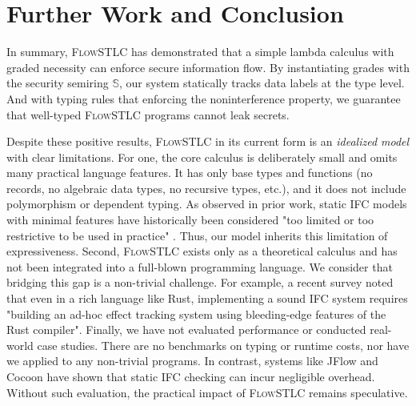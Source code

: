 \documentclass[conference]{IEEEtran}
\newcommand\secure{\mathbb{S}}
\begin{document}
\section{Further Work and Conclusion}

In summary, \textsc{FlowSTLC} has demonstrated that a simple lambda calculus with graded necessity can enforce secure information flow. By instantiating grades with the  security semiring $\secure$, our system statically tracks data labels at the type level. And with typing rules that enforcing the noninterference property, we guarantee that well-typed \textsc{FlowSTLC} programs cannot leak secrets. 

Despite these positive results, \textsc{FlowSTLC} in its current form is an \emph{idealized model} with clear limitations. For one, the core calculus is deliberately small and omits many practical language features. It has only base types and functions (no records, no algebraic data types, no recursive types, etc.), and it does not include polymorphism or dependent typing. As observed in prior work, static IFC models with minimal features have historically been considered "too limited or too restrictive to be used in practice" \cite{myers1999jflow}. Thus, our model inherits this limitation of expressiveness. Second, \textsc{FlowSTLC} exists only as a theoretical calculus and has not been integrated into a full-blown programming language. We consider that bridging this gap is a non-trivial challenge. For example, a recent survey noted that even in a rich language like Rust, implementing a sound IFC system requires "building an ad-hoc effect tracking system using bleeding-edge features of the Rust compiler". Finally, we have not evaluated performance or conducted real-world case studies. There are no benchmarks on typing or runtime costs, nor have we applied  to any non-trivial programs. In contrast, systems like JFlow and Cocoon \cite{lamba2024cocoon} have shown that static IFC checking can incur negligible overhead. Without such evaluation, the practical impact of \textsc{FlowSTLC} remains speculative.
\end{document}
